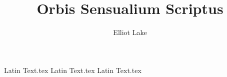 \documentclass[11pt]{book}
\author{Elliot Lake}
\title{Orbis Sensualium Scriptus}
\begin{document}
\maketitle 
\tableofcontents

{Latin Text.tex}
{Latin Text.tex}
{Latin Text.tex}
\end{document}
